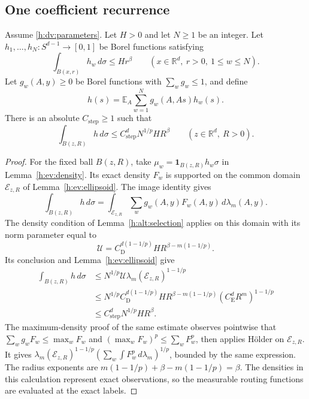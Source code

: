 \subsection{One coefficient recurrence}

\begin{proposition}
\label{h:ev:coefficient-step}
Assume \eqref{h:dv:parameters}.  Let \(H>0\) and let \(N\ge1\) be an
integer.  Let
\(h_1,\ldots,h_N:S^{d-1}\to[0,1]\) be Borel functions satisfying
\[
 \int_{B(x,r)}h_w\,d\sigma\le H r^\beta
 \qquad(x\in\mathbb R^d,\ r>0,\ 1\le w\le N).
\]
Let \(g_w(A,y)\ge0\) be Borel functions with \(\sum_wg_w\le1\), and
define
\[
 h(s)=\mathbb E_A\sum_{w=1}^N g_w(A,As)h_w(s).
\]
There is an absolute \(C_{\mathrm{step}}\ge1\) such that
\begin{equation}\label{h:ev:coefficient-bound}
 \int_{B(z,R)}h\,d\sigma
 \le C_{\mathrm{step}}^dN^{1/p}H R^\beta
 \qquad(z\in\mathbb R^d,\ R>0).
\end{equation}
\end{proposition}

\begin{proof}
For the fixed ball \(B(z,R)\), take
\(\mu_w=\mathbf1_{B(z,R)}h_w\sigma\) in
Lemma~\ref{h:ev:density}.  Its exact density \(F_w\) is supported
on the common domain \(\mathcal E_{z,R}\) of
Lemma~\ref{h:ev:ellipsoid}.  The image identity gives
\[
 \int_{B(z,R)}h\,d\sigma
 =\int_{\mathcal E_{z,R}}\sum_w g_w(A,y)F_w(A,y)
       \,d\lambda_m(A,y).
\]
The density condition of Lemma~\ref{h:alt:selection} applies on this
domain with its norm parameter equal to
\[
 \mathcal U=C_{\mathrm D}^{d(1-1/p)}
             H R^{\beta-m(1-1/p)}.
\]
Its conclusion and Lemma~\ref{h:ev:ellipsoid} give
\begin{align*}
 \int_{B(z,R)}h\,d\sigma
 &\le N^{1/p}\mathcal U
       \lambda_m(\mathcal E_{z,R})^{1-1/p}\\
 &\le N^{1/p}C_{\mathrm D}^{d(1-1/p)}
       H R^{\beta-m(1-1/p)}(C_{\mathrm E}^dR^m)^{1-1/p}\\
 &\le C_{\mathrm{step}}^dN^{1/p}H R^\beta.
\end{align*}
The maximum-density proof of the same estimate observes pointwise that
\(\sum_wg_wF_w\le\max_wF_w\) and
\((\max_wF_w)^p\le\sum_wF_w^p\), then applies H\"older on
\(\mathcal E_{z,R}\).  It gives
\(\lambda_m(\mathcal E_{z,R})^{1-1/p}
(\sum_w\int F_w^p\,d\lambda_m)^{1/p}\), bounded by the same expression.
The radius exponents are
\(m(1-1/p)+\beta-m(1-1/p)=\beta\).
The densities in this calculation represent exact observations, so
the measurable routing functions are evaluated at the exact labels.
\end{proof}

